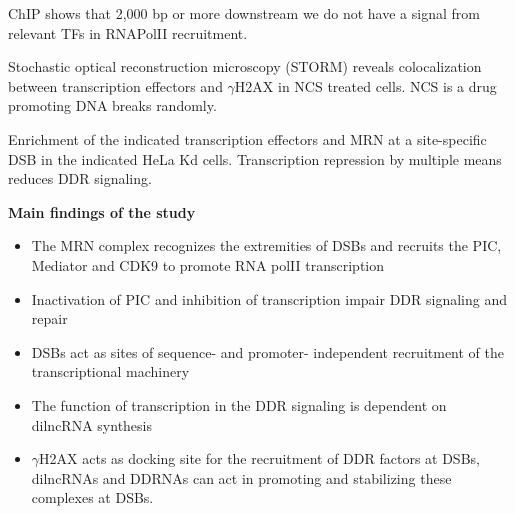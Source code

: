 ChIP shows that 2,000 bp or more downstream we do not have a signal from relevant TFs in RNAPolII recruitment.

Stochastic optical reconstruction microscopy (STORM) reveals colocalization between transcription effectors and \(\gamma\)H2AX in NCS treated cells. NCS is a drug promoting DNA breaks randomly.

Enrichment of the indicated transcription effectors and MRN at a site-specific DSB in the indicated HeLa Kd cells. Transcription repression by multiple means reduces DDR signaling.

\textbf{Main findings of the study}

\begin{itemize}
\tightlist
\item
  The MRN complex recognizes the extremities of DSBs and recruits the PIC, Mediator and CDK9 to promote RNA polII transcription
\item
  Inactivation of PIC and inhibition of transcription impair DDR signaling and repair
\item
  DSBs act as sites of sequence- and promoter- independent recruitment of the transcriptional machinery
\item
  The function of transcription in the DDR signaling is dependent on dilncRNA synthesis
\item
  \(\gamma\)H2AX acts as docking site for the recruitment of DDR factors at DSBs, dilncRNAs and DDRNAs can act in promoting and stabilizing these complexes at DSBs.
\end{itemize}
